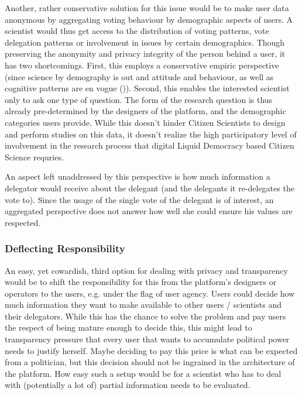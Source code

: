 Another, rather conservative solution for this issue would be to make user data anonymous by aggregating voting behaviour by demographic aspects of users. A scientist would thus get access to the distribution of voting patterns, vote delegation patterns or involvement in issues by certain demographics. Though preserving the anonymity and privacy integrity of the person behind a user, it has two shortcomings. First, this employs a conservative empiric perspective (since science by demography is out and attitude and behaviour, as well as cognitive patterns are en vogue ()). Second, this enables the interested scientist only to ask one type of question. The form of the research question is thus already pre-determined by the designers of the platform, and the demographic categories users provide. While this doesn't hinder Citizen Scientists to design and perform studies on this data, it doesn't realize the high participatory level of involvement in the research process that digital Liquid Democracy based Citizen Science requries.

An aspect left unaddressed by this perspective is how much information a delegator would receive about the delegant (and the delegants it re-delegates the vote to). Since the usage of the single vote of the delegant is of interest, an aggregated perspective does not answer how well she could ensure his values are respected. 

\subsubsection{Deflecting Responsibility}

An easy, yet cowardish, third option for dealing with privacy and transparency would be to shift the responsibility for this from the platform's designers or operators to the users, e.g. under the flag of user agency. Users could decide how much information they want to make available to other users / scientists and their delegators. While this has the chance to solve the problem and pay users the respect of being mature enough to decide this, this might lead to transparency pressure that every user that wants to accumulate political power needs to justify herself. Maybe deciding to pay this price is what can be expected from a politician, but this decision should not be ingrained in the architecture of the platform. How easy such a setup would be for a scientist who has to deal with (potentially a lot of) partial information needs to be evaluated.

